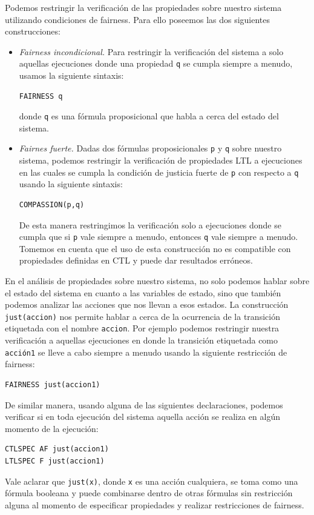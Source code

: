 \documentclass[titlepage, 12pt]{book}
\begin{document}
Podemos restringir la verificaci\'on de las propiedades sobre nuestro sistema utilizando condiciones de fairness. Para ello poseemos las dos siguientes construcciones:
\begin{itemize}
\item \textit{Fairness incondicional.} Para restringir la verificaci\'on del sistema a solo aquellas ejecuciones donde una propiedad \texttt{q} se cumpla siempre a menudo, usamos la siguiente sintaxis: \begin{verbatim}FAIRNESS q\end{verbatim} donde \texttt{q} es una f\'ormula proposicional que habla a cerca del estado del sistema.
\item \textit{Fairnes fuerte.} Dadas dos f\'ormulas proposicionales \texttt{p} y \texttt{q} sobre nuestro sistema, podemos restringir la verificaci\'on de propiedades LTL a ejecuciones en las cuales se cumpla la condici\'on de justicia fuerte de \texttt{p} con respecto a \texttt{q} usando la siguiente sintaxis: \begin{verbatim}COMPASSION(p,q)\end{verbatim} De esta manera restringimos la verificaci\'on solo a ejecuciones donde se cumpla que si \texttt{p} vale siempre a menudo, entonces \texttt{q} vale siempre a menudo. Tomemos en cuenta que el uso de esta construcci\'on no es compatible con propiedades definidas en CTL y puede dar resultados err\'oneos.
\end{itemize}

En el an\'alisis de propiedades sobre nuestro sistema, no solo podemos hablar sobre el estado del sistema en cuanto a las variables de estado, sino que tambi\'en podemos analizar las acciones que nos llevan a esos estados. La construcci\'on \texttt{just(accion)} nos permite hablar a cerca de la ocurrencia de la transici\'on etiquetada con el nombre \texttt{accion}. Por ejemplo podemos restringir nuestra verificaci\'on a aquellas ejecuciones en donde la transici\'on etiquetada como \texttt{acci\'on1} se lleve a cabo siempre a menudo usando la siguiente restricci\'on de fairness:
\begin{verbatim}
FAIRNESS just(accion1)
\end{verbatim}
De similar manera, usando alguna de las siguientes declaraciones, podemos verificar si en toda ejecuci\'on del sistema aquella acci\'on se realiza en alg\'un momento de la ejecuci\'on:
\begin{verbatim}
CTLSPEC AF just(accion1)
LTLSPEC F just(accion1)
\end{verbatim}
Vale aclarar que \texttt{just(x)}, donde \texttt{x} es una acci\'on cualquiera, se toma como una f\'ormula booleana y puede combinarse dentro de otras f\'ormulas sin restricci\'on alguna al momento de especificar propiedades y realizar restricciones de fairness.
\end{document}
